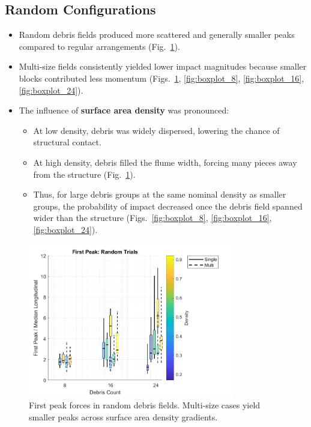 \documentclass{article}
\begin{document}
\subsection{Random Configurations}
\begin{itemize}
    \item Random debris fields produced more scattered and generally smaller peaks compared to regular arrangements (Fig.~\ref{fig:random_peaks_first}).
    \item Multi-size fields consistently yielded lower impact magnitudes because smaller blocks contributed less momentum (Figs.~\ref{fig:random_peaks_first}, \ref{fig:boxplot_8}, \ref{fig:boxplot_16}, \ref{fig:boxplot_24}).
    \item The influence of \textbf{surface area density} was pronounced:
    \begin{itemize}
        \item At low density, debris was widely dispersed, lowering the chance of structural contact.
        \item At high density, debris filled the flume width, forcing many pieces away from the structure (Fig.~\ref{fig:random_peaks_first}).
        \item Thus, for large debris groups at the same nominal density as smaller groups, the probability of impact decreased once the debris field spanned wider than the structure (Figs.~\ref{fig:boxplot_8}, \ref{fig:boxplot_16}, \ref{fig:boxplot_24}).
    \end{itemize}
\end{itemize}

\begin{figure}[htbp]
    \centering
    \includegraphics[width=0.8\textwidth]{First_Peak_Random_Single_vs_Multi_ByDensityGradient.png}
    \caption{First peak forces in random debris fields. Multi-size cases yield smaller peaks across surface area density gradients.}
    \label{fig:random_peaks_first}
\end{figure}
\end{document}
